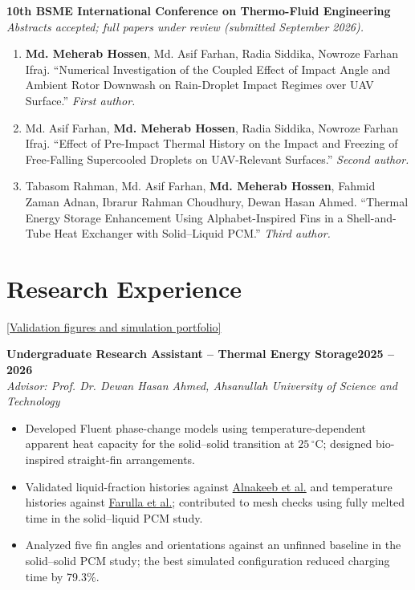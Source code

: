 \documentclass[11pt,a4paper]{article}
\newcommand{\cvlink}[2]{\href{#1}{\textnormal{\small[#2]}}}
\newcommand{\role}[3]{%
  \Needspace{4\baselineskip}%
  \textbf{#1}\hfill\textbf{#2}\\
  \textit{#3}\par
}
\begin{document}
\vspace{3pt}\textbf{10th BSME International Conference on Thermo-Fluid Engineering}\\
\textit{Abstracts accepted; full papers under review (submitted September 2026).}
\begin{enumerate}
  \item \textbf{Md. Meherab Hossen}, Md. Asif Farhan, Radia Siddika, Nowroze Farhan Ifraj. ``Numerical Investigation of the Coupled Effect of Impact Angle and Ambient Rotor Downwash on Rain-Droplet Impact Regimes over UAV Surface.'' \textit{First author.}
  \item Md. Asif Farhan, \textbf{Md. Meherab Hossen}, Radia Siddika, Nowroze Farhan Ifraj. ``Effect of Pre-Impact Thermal History on the Impact and Freezing of Free-Falling Supercooled Droplets on UAV-Relevant Surfaces.'' \textit{Second author.}
  \item Tabasom Rahman, Md. Asif Farhan, \textbf{Md. Meherab Hossen}, Fahmid Zaman Adnan, Ibrarur Rahman Choudhury, Dewan Hasan Ahmed. ``Thermal Energy Storage Enhancement Using Alphabet-Inspired Fins in a Shell-and-Tube Heat Exchanger with Solid--Liquid PCM.'' \textit{Third author.}
\end{enumerate}
\endgroup

\section*{Research Experience}
\cvlink{https://github.com/cfdmeherabhossen/meherabhossen/blob/main/RESEARCH_EVIDENCE.md}{Validation figures and simulation portfolio}\par\vspace{2pt}
\role{Undergraduate Research Assistant -- Thermal Energy Storage}{2025 -- 2026}
{Advisor: Prof. Dr. Dewan Hasan Ahmed, Ahsanullah University of Science and Technology}
\begin{itemize}
  \item Developed Fluent phase-change models using temperature-dependent apparent heat capacity
  for the solid--solid transition at \(25\,^{\circ}\mathrm{C}\); designed bio-inspired straight-fin arrangements.
  \item Validated liquid-fraction histories against
  \href{https://meherabhossen.pages.dev/\#research-pcm}{Alnakeeb et al.} and temperature histories against
  \href{https://meherabhossen.pages.dev/\#research-plaster}{Farulla et al.}; contributed to mesh checks using
  fully melted time in the solid--liquid PCM study.
  \item Analyzed five fin angles and orientations against an unfinned baseline in the solid--solid
  PCM study; the best simulated configuration reduced charging time by 79.3\%.
\end{itemize}
\end{document}

